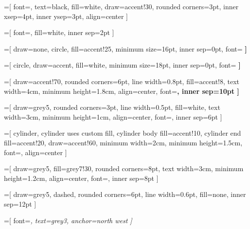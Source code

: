 
=[
  font=\footnotesize,         %
  text=black,
  fill=white,
  draw=accent!30,
  rounded corners=3pt,
  inner xsep=4pt,             %
  inner ysep=3pt,             %
  align=center
]

=[
  font=\footnotesize,         %
  fill=white,
  inner sep=2pt
]


=[
  draw=none,
  circle,
  fill=accent!25,
  minimum size=16pt,          %
  inner sep=0pt,
  font=\footnotesize\bfseries %
]

=[
  circle,
  draw=accent,
  fill=white,
  minimum size=18pt,
  inner sep=0pt,
  font=\footnotesize\bfseries
]


=[
  draw=accent!70,
  rounded corners=6pt,
  line width=0.8pt,
  fill=accent!8,
  text width=4cm,
  minimum height=1.8cm,
  align=center,
  font=\small\bfseries,
  inner sep=10pt
]

=[
  draw=grey5,
  rounded corners=3pt,
  line width=0.5pt,
  fill=white,
  text width=3cm,
  minimum height=1cm,
  align=center,
  font=\footnotesize,
  inner sep=6pt
]

=[
  cylinder,
  cylinder uses custom fill,
  cylinder body fill=accent!10,
  cylinder end fill=accent!20,
  draw=accent!60,
  minimum width=2cm,
  minimum height=1.5cm,
  font=\small,
  align=center
]

=[
  draw=grey5,
  fill=grey7!30,
  rounded corners=8pt,
  text width=3cm,
  minimum height=1.2cm,
  align=center,
  font=\small,
  inner sep=8pt
]


=[
  draw=grey5,
  dashed,
  rounded corners=6pt,
  line width=0.6pt,
  fill=none,
  inner sep=12pt
]

=[
  font=\footnotesize\itshape,
  text=grey3,
  anchor=north west
]

